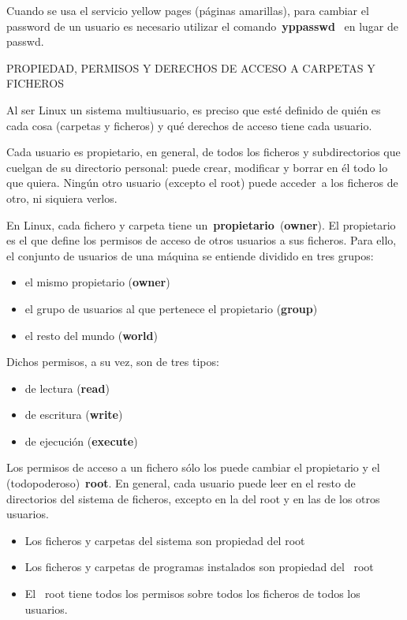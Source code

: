 \documentclass[
  jou,
  floatsintext,
  longtable,
  a4paper,
  nolmodern,
  notxfonts,
  notimes,
  12pt,
  colorlinks=true,linkcolor=blue,citecolor=blue,urlcolor=blue]{apa7}
\providecommand{\tightlist}{%
  \setlength{\itemsep}{0pt}\setlength{\parskip}{0pt}}
\begin{document}
Cuando se usa el servicio yellow pages (páginas amarillas), para cambiar
el password de un usuario es necesario utilizar el
comando~\textbf{yppasswd}~ en lugar de passwd.

PROPIEDAD, PERMISOS Y DERECHOS DE ACCESO A CARPETAS Y FICHEROS

Al ser Linux un sistema multiusuario, es preciso que esté definido de
quién es cada cosa (carpetas y ficheros) y qué derechos de acceso tiene
cada usuario.

Cada usuario es propietario, en general, de todos los ficheros y
subdirectorios que cuelgan de su directorio personal: puede crear,
modificar y borrar en él todo lo que quiera. Ningún otro usuario
(excepto el root) puede acceder~a los ficheros de otro, ni siquiera
verlos.

En Linux, cada fichero y carpeta tiene
un~\textbf{propietario}~(\textbf{owner}). El propietario es el que
define los permisos de acceso de otros usuarios a sus ficheros. Para
ello, el conjunto de usuarios de una máquina se entiende dividido en
tres grupos:

\begin{itemize}
\tightlist
\item
  el mismo propietario (\textbf{owner})
\item
  el grupo de usuarios al que pertenece el propietario (\textbf{group})
\item
  el resto del mundo (\textbf{world})
\end{itemize}

Dichos permisos, a su vez, son de tres tipos:

\begin{itemize}
\tightlist
\item
  de lectura (\textbf{read})
\item
  de escritura (\textbf{write})
\item
  de ejecución (\textbf{execute})
\end{itemize}

Los permisos de acceso a un fichero sólo los puede cambiar el
propietario y el (todopoderoso)~\textbf{root}. En general, cada usuario
puede leer en el resto de directorios del sistema de ficheros, excepto
en la del root y en las de los otros usuarios.

\begin{itemize}
\tightlist
\item
  Los ficheros y carpetas del sistema son propiedad del root
\item
  Los ficheros y carpetas de programas instalados son propiedad del~
  root
\item
  El~ root tiene todos los permisos sobre todos los ficheros de todos
  los usuarios.
\end{itemize}
\end{document}
